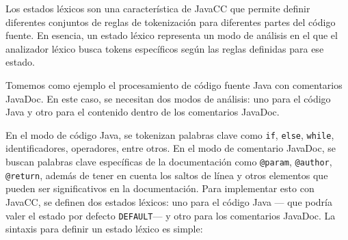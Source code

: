 





\noindent Los estados léxicos son una característica de JavaCC que permite definir diferentes conjuntos de reglas de tokenización para diferentes partes del código fuente. En esencia, un estado léxico representa un modo de análisis en el que el analizador léxico busca tokens específicos según las reglas definidas para ese estado.

Tomemos como ejemplo el procesamiento de código fuente Java con comentarios JavaDoc. En este caso, se necesitan dos modos de análisis: uno para el código Java y otro para el contenido dentro de los comentarios JavaDoc.

En el modo de código Java, se tokenizan palabras clave como \lstinline|if|, \lstinline|else|, \lstinline|while|, identificadores, operadores, entre otros.
En el modo de comentario JavaDoc, se buscan palabras clave específicas de la documentación como \lstinline|@param|, \lstinline|@author|, \lstinline|@return|, además de tener en cuenta los saltos de línea y otros elementos que pueden ser significativos en la documentación.
Para implementar esto con JavaCC, se definen dos estados léxicos: uno para el código Java ---%
que podría valer el estado por defecto \lstinline|DEFAULT|--- y otro para los comentarios JavaDoc. La sintaxis para definir un estado léxico es simple:

